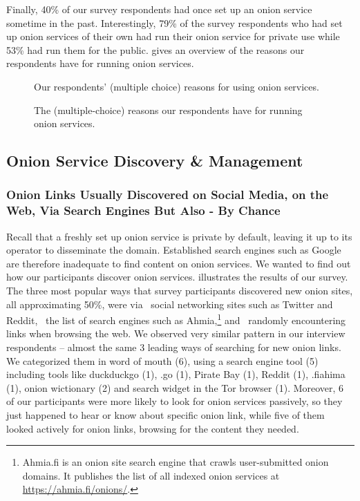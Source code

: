 Finally, 40\% of our survey respondents had once set up an onion service sometime in the past. 
Interestingly, 79\% of the survey respondents who had set up onion services of their own had run their onion service for
private use while 53\% had run them for the public.  gives an overview of the reasons our
respondents have for running onion services. 


\begin{figure}[t]
    \centering
    
    \caption{Our respondents' (multiple choice) reasons for using onion
    services.}
    \label{fig:onion-usage}
\end{figure}



\begin{figure}[t]
    \centering
    
    \caption{The (multiple-choice) reasons our respondents have for running
    onion services.}
    \label{fig:onion-operation-reasons}
\end{figure}

\subsection{Onion Service Discovery \& Management}
\label{sec:manage}

\subsubsection{Onion Links Usually Discovered on Social Media, on the Web, Via Search Engines But Also - By Chance}
Recall that a freshly set up onion service is private by default, leaving it up
to its operator to disseminate the domain.  Established search engines such as
Google are therefore inadequate to find content on onion services.  We wanted to
find out how our participants discover onion services.
 illustrates the results of our survey.  The three most popular ways
that survey participants discovered new onion sites, all approximating 50\%, were via \first~social
networking sites such as Twitter and Reddit, \second~the list of search engines
such as Ahmia,\footnote{Ahmia.fi is an onion site search engine that crawls
user-submitted onion domains.  It publishes the list of all indexed onion
services at \url{https://ahmia.fi/onions/}.} and \third~randomly encountering
links when browsing the web. 
We observed very similar pattern in our interview respondents – almost the same 3 leading ways of searching for new onion links.  We categorized them in word of mouth (6), using a search engine tool (5) including tools like duckduckgo (1), .go (1), Pirate Bay (1), Reddit (1), .fiahima (1), onion wictionary (2) and search widget in the Tor browser (1). Moreover, 6 of our participants were more likely to look for onion services passively, so they just happened to hear or know about specific onion link, while five of them looked actively for onion links, browsing for the content they needed.

